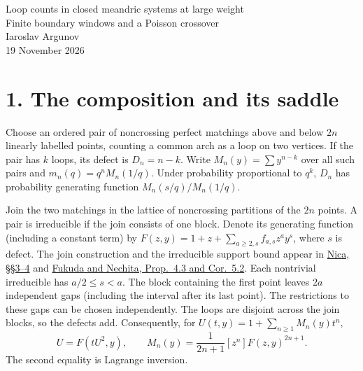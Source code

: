 \documentclass[11pt,letterpaper]{article}
\begin{document}
\begin{center}
{\LARGE Loop counts in closed meandric systems at large weight}\\[7pt]
{\large Finite boundary windows and a Poisson crossover}\\[8pt]
Iaroslav Argunov\\[3pt]
{\small 19 November 2026}
\end{center}
\begin{abstract}
Give each loop of a closed meandric system a factor \(q\). A finite-window
frontier estimate proves that the partition function has an
\(n^{-3/2}\) prefactor for every fixed real \(q\ge18\). The bound also
places the mean and fluctuations of the loop count in the range of a
conditional local central limit theorem. If \(q\) tends to infinity,
the defect from the maximal loop count is asymptotically Poisson in
total variation with an explicitly defined mean. Replacing that mean
by its leading term \(2n/q\) gives a sharp crossover at \(q\asymp
n^{1/3}\). The predicted transition of the partition function at
\(q=2\) remains outside the range certified here.
\end{abstract}

\section*{1. The composition and its saddle}
Choose an ordered pair of noncrossing perfect matchings above and below
\(2n\) linearly labelled points, counting a common arch as a loop on
two vertices. If the pair has \(k\) loops, its defect is \(D_n=n-k\).
Write \(M_n(y)=\sum y^{n-k}\) over all such pairs and \(m_n(q)=q^n
M_n(1/q)\). Under probability proportional to \(q^k\), \(D_n\) has
probability generating function \(M_n(s/q)/M_n(1/q)\).

Join the two matchings in the lattice of noncrossing partitions of
the \(2n\) points. A pair is irreducible if the join consists of one
block. Denote its generating function (including a constant term) by
\(F(z,y)=1+z+\sum_{a\ge2,s} f_{a,s}z^ay^s\), where \(s\) is defect.
The join construction and the irreducible support bound appear in
\href{https://arxiv.org/abs/1506.01345}{Nica, \S\S3--4} and
\href{https://doi.org/10.4171/AIHPD/80}{Fukuda and Nechita, Prop.~4.3
and Cor.~5.2}. Each nontrivial irreducible has \(a/2\le s<a\).
The block containing the first point leaves \(2a\) independent gaps
(including the interval after its last point). The restrictions to
these gaps can be chosen independently. The loops are disjoint across
the join blocks, so the defects add. Consequently, for
\(U(t,y)=1+\sum_{n\ge1}M_n(y)t^n\),
\[
 U=F(tU^2,y),\qquad
 M_n(y)=\frac1{2n+1}[z^n]F(z,y)^{2n+1}.
 \tag{1}
\]
The second equality is Lagrange inversion.
\end{document}
